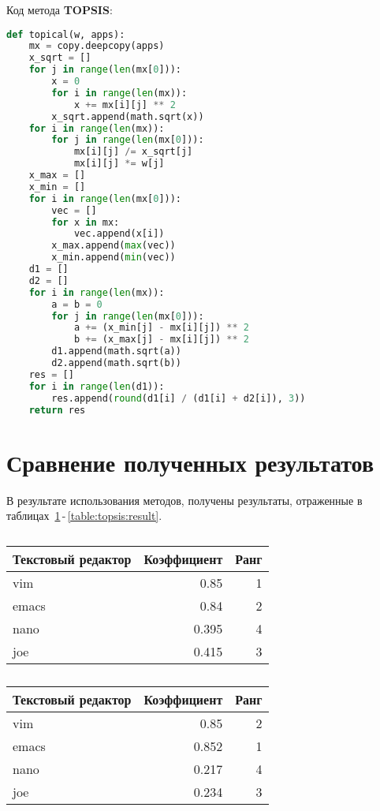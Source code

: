 Код метода \textbf{TOPSIS}:
\begin{lstlisting}[language=Python]
def topical(w, apps):
	mx = copy.deepcopy(apps)
	x_sqrt = []
	for j in range(len(mx[0])):
		x = 0
		for i in range(len(mx)):
			x += mx[i][j] ** 2
		x_sqrt.append(math.sqrt(x))
	for i in range(len(mx)):
		for j in range(len(mx[0])):
			mx[i][j] /= x_sqrt[j]
			mx[i][j] *= w[j]
	x_max = []
	x_min = []
	for i in range(len(mx[0])):
		vec = []
		for x in mx:
			vec.append(x[i])
		x_max.append(max(vec))
		x_min.append(min(vec))
	d1 = []
	d2 = []
	for i in range(len(mx)):
		a = b = 0
		for j in range(len(mx[0])):
			a += (x_min[j] - mx[i][j]) ** 2
			b += (x_max[j] - mx[i][j]) ** 2
		d1.append(math.sqrt(a))
		d2.append(math.sqrt(b))
	res = []
	for i in range(len(d1)):
		res.append(round(d1[i] / (d1[i] + d2[i]), 3))
	return res
\end{lstlisting}

\section{Сравнение полученных результатов}
В результате использования методов, получены результаты, отраженные
в таблицах~\ref{table:saw:result}\,-\,\ref{table:topsis:result}.

\begin{table}[h!tp]
	\centering
	\caption{}
	\label{table:saw:result}
	\begin{tabular}{|l|r|r|}
		\hline Текстовый редактор & Коэффициент & Ранг\\ \hline
		vim & 0.85 & 1\\ \hline
		emacs & 0.84 & 2\\ \hline
		nano & 0.395 & 4\\ \hline
		joe & 0.415 & 3\\ \hline
	\end{tabular}
\end{table}

\begin{table}[h!tp]
	\centering
	\caption{}
	\label{table:mout:result}
	\begin{tabular}{|l|r|r|}
		\hline Текстовый редактор & Коэффициент & Ранг\\ \hline
		vim & 0.85 & 2\\ \hline
		emacs & 0.852 & 1\\ \hline
		nano & 0.217 & 4\\ \hline
		joe & 0.234 & 3\\ \hline
	\end{tabular}
\end{table}

